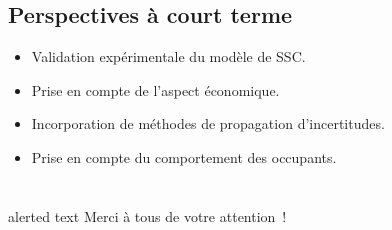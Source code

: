 \documentclass[xcolor=x11names, compress, 11pt]{beamer}
\newcommand{\addalert}[1]{%
\begin{beamercolorbox}[sep=2pt,center,shadow=true,rounded=true]{alerted text}
    #1\par%
\end{beamercolorbox}%
}
\begin{document}
\subsection{Perspectives à court terme}
\begin{frame}[c]
    \vfill
    \begin{itemize}
        \item Validation expérimentale du modèle de SSC.
    \vfill
        \item<2-> Prise en compte de l’aspect économique.
    \vfill
        \item<3-> Incorporation de méthodes de propagation d’incertitudes.
    \vfill
        \item<4-> Prise en compte du comportement des occupants.
    \end{itemize}
    \vfill
\end{frame}



\section*{}
\begin{frame}[plain, c]
    \vfill
    \addalert{Merci à tous de votre attention~!}
    \vfill
\end{frame}









\end{document}
